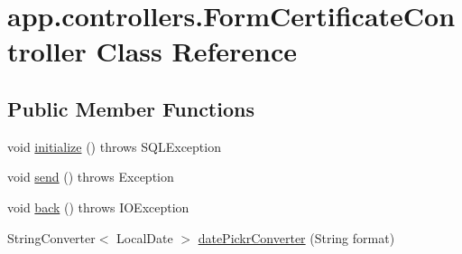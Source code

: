 \hypertarget{classapp_1_1controllers_1_1_form_certificate_controller}{}\section{app.\+controllers.\+Form\+Certificate\+Controller Class Reference}
\label{classapp_1_1controllers_1_1_form_certificate_controller}
\subsection*{Public Member Functions}
\begin{DoxyCompactItemize}
\item 
void \mbox{\hyperlink{classapp_1_1controllers_1_1_form_certificate_controller_a87792b2c98ab26177ab519e947f2a076}{initialize}} ()  throws S\+Q\+L\+Exception 
\item 
void \mbox{\hyperlink{classapp_1_1controllers_1_1_form_certificate_controller_aac1957fec1cdad0c0c65873c8835391e}{send}} ()  throws Exception 
\item 
void \mbox{\hyperlink{classapp_1_1controllers_1_1_form_certificate_controller_a0c5d9e7a2c2ee91e7c0792a012f4b5c2}{back}} ()  throws I\+O\+Exception 
\item 
String\+Converter$<$ Local\+Date $>$ \mbox{\hyperlink{classapp_1_1controllers_1_1_form_certificate_controller_a680747fac245239c02a4b20906e12cd6}{date\+Pickr\+Converter}} (String format)
\end{DoxyCompactItemize}
